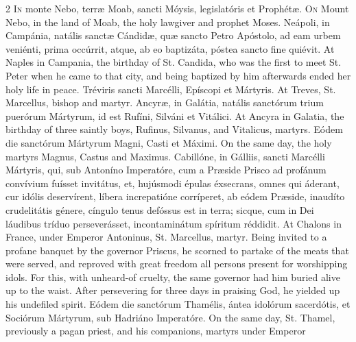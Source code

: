 \begin{paracol}{2}
\lettrine[lines=2]{I}{n} monte Nebo, terræ 
 Moab, sancti Móysis, legislatóris et Prophétæ.
\switchcolumn
{}
\lettrine[lines=2]{O}{n} Mount Nebo, in the land of Moab, 
 the holy lawgiver and prophet Moses.
\switchcolumn*
{}
Neápoli, in Campánia, natális sanctæ Cándidæ, quæ sancto Petro Apóstolo, ad eam urbem veniénti, 
 prima occúrrit, atque, ab eo baptizáta, póstea sancto fine quiévit.
\switchcolumn
{}
At Naples in Campania, the birthday 
 of St. Candida, who was the first to meet St. Peter when he came to that 
 city, and being baptized by him afterwards ended her holy life in peace.
\switchcolumn*
{}
Tréviris sancti 
 Marcélli, Epíscopi et Mártyris.
\switchcolumn
{}
At Treves, St. Marcellus, bishop and 
 martyr.
\switchcolumn*
{}
Ancyræ, in Galátia, natális sanctórum trium puerórum Mártyrum, id est Rufíni, Silváni et 
 Vitálici.
\switchcolumn
{}
At Ancyra in Galatia, the birthday 
 of three saintly boys, Rufinus, Silvanus, and Vitalicus, martyrs.
\switchcolumn*
{}
Eódem die sanctórum 
 Mártyrum Magni, Casti et Máximi.
\switchcolumn
{}
On the same day, the holy martyrs 
 Magnus, Castus and Maximus.
\switchcolumn*
{}
Cabillóne, in Gálliis, 
 sancti Marcélli Mártyris, qui, sub Antoníno Imperatóre, cum a Præside Prisco 
 ad profánum convívium fuísset invitátus, et, hujúsmodi épulas éxsecrans, 
 omnes qui áderant, cur idólis deservírent, líbera increpatióne corríperet, 
 ab eódem Præside, inaudíto crudelitátis génere, cíngulo tenus defóssus est 
 in terra; sicque, cum in Dei láudibus tríduo perseverásset, incontaminátum 
 spíritum réddidit.
\switchcolumn
{}
At Chalons in France, under Emperor 
 Antoninus, St. Marcellus, martyr. Being invited to a profane banquet 
 by the governor Priscus, he scorned to partake of the meats that were 
 served, and reproved with great freedom all persons present for worshipping 
 idols. For this, with unheard-of cruelty, the same governor had him 
 buried alive up to the waist. After persevering for three days in 
 praising God, he yielded up his undefiled spirit.
\switchcolumn*
{}
Eódem die sanctórum 
 Thamélis, ántea idolórum sacerdótis, et Sociórum Mártyrum, sub Hadriáno 
 Imperatóre.
\switchcolumn
{}
On the same day, St. Thamel, 
 previously a pagan priest, and his companions, martyrs under Emperor 

\end{paracol}
